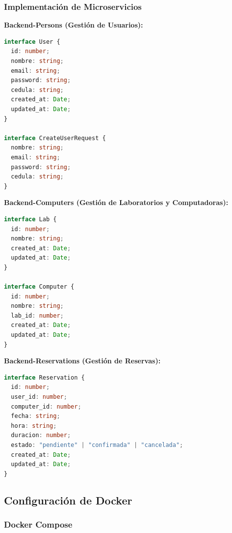 \documentclass[12pt,a4paper]{article}
\begin{document}
\subsubsection{Implementación de Microservicios}

\textbf{Backend-Persons (Gestión de Usuarios):}

\begin{lstlisting}[language=TypeScript, caption=Interfaces de Usuario]
interface User {
  id: number;
  nombre: string;
  email: string;
  password: string;
  cedula: string;
  created_at: Date;
  updated_at: Date;
}

interface CreateUserRequest {
  nombre: string;
  email: string;
  password: string;
  cedula: string;
}
\end{lstlisting}

\textbf{Backend-Computers (Gestión de Laboratorios y Computadoras):}

\begin{lstlisting}[language=TypeScript, caption=Interfaces de Laboratorio y Computadora]
interface Lab {
  id: number;
  nombre: string;
  created_at: Date;
  updated_at: Date;
}

interface Computer {
  id: number;
  nombre: string;
  lab_id: number;
  created_at: Date;
  updated_at: Date;
}
\end{lstlisting}

\textbf{Backend-Reservations (Gestión de Reservas):}

\begin{lstlisting}[language=TypeScript, caption=Interface de Reserva]
interface Reservation {
  id: number;
  user_id: number;
  computer_id: number;
  fecha: string;
  hora: string;
  duracion: number;
  estado: "pendiente" | "confirmada" | "cancelada";
  created_at: Date;
  updated_at: Date;
}
\end{lstlisting}

\subsection{Configuración de Docker}

\subsubsection{Docker Compose}
\end{document}
